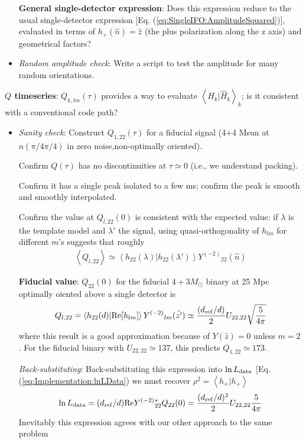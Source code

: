 \documentclass[twocolumn,prd,nofootinbib]{revtex4}
\newcommand\Y[1]{Y^{(#1)}{}}
\newcommand\qmstateproduct[2]{\left\langle#1|#2\right\rangle}
\begin{document}
\begin{widetext}
\begin{widetext}
\begin{itemize}
\begin{shaded}
\noindent \textbf{General single-detector expression}: Does this expression reduce to the usual single-detector
expression [Eq. (\ref{eq:SingleIFO:AmplitudeSquared})], evaluated in terms of $h_{+}(\hat{n})=\hat{z}$ (the plus polarization along the z axis) and geometrical
factors?  
\end{shaded}

\item \emph{Random amplitude check}: Write a script to test the amplitude for many random orientations.
\end{itemize}

\noindent \textbf{$Q$ timeseries}: $Q_{k,lm}(\tau)$ provides a way to evaluate $\qmstateproduct{H_k}{\hat{H}_k}_k$; is
it consistent with a conventional code path?  
\begin{itemize}
\item \emph{Sanity check}: Construct $Q_{1,22}(\tau)$ for a fiducial signal (4+4 Msun at $\hat{n}(\pi/4\pi/4)$ in zero
  noise,non-optimally oriented).


Confirm $Q(\tau)$ has no discontinuities at $\tau\simeq 0$ (i.e., we understand packing).

Confirm it has a single peak isolated to a few ms; confirm the peak is smooth and smoothly interpolated.

Confirm the  value at $Q_{l,22}(0)$ is consistent with the expected value: if $\lambda$ is the template model and
$\lambda'$ the signal, using quasi-orthogonality of $h_{lm}$ for different $m$'s suggests that roughly
\begin{eqnarray}
\left< Q_{l,22} \right> \simeq \qmstateproduct{h_{22}(\lambda)}{h_{22}(\lambda')}\Y{-2}_{22}(\hat{n})
\end{eqnarray}

\begin{shaded}
\noindent \textbf{Fiducial value}: $Q_{22}(0)$ for the fiducial $4+3 M_\odot$ binary at 25 Mpc optimally oiented above a
single detector is
 \begin{eqnarray}
\label{eq:SpecialCase:SingleIFOOptimalOrientation}
 Q_{l,22} = \qmstateproduct{h_{22}(d)}{\text{Re}[h_{lm}]}\Y{-2}_{lm}(\hat{z'}) 
\simeq  \frac{(d_{\rm ref}/d)}{2}  U_{22,22} \sqrt{ \frac{5}{4\pi}}
 \end{eqnarray}
where this result is a good approximation because of $Y(\hat{z})=0$ unless $m=2$. For the fiducial binary with
$U_{22,22}\simeq 137$, this predicts $Q_{1,22}\simeq 173$.

\noindent \emph{Back-substituting}: Back-substituting this expression into $\ln L_{\rm data}$
          [Eq. (\ref{eq:Implementation:lnLData}) we must recover $\rho^2 = \qmstateproduct{h_+}{h_+}$
\begin{eqnarray}
\ln L_{\rm data} = (d_{\rm ref}/d) \text{Re} \Y{-2}_{22}^* Q_{22}(0) = \frac{(d_{\rm ref}/d)^2}{2} U_{22,22} \frac{5}{4\pi}
\end{eqnarray}
Inevitably this expression agrees with our other approach to the same problem
\end{shaded}




\end{itemize}
\end{widetext}
\end{widetext}
\end{document}
